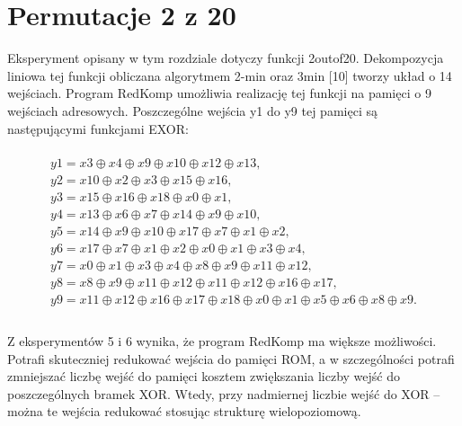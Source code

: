 \section{Permutacje 2 z 20}

Eksperyment opisany w tym rozdziale dotyczy funkcji 2outof20.
Dekompozycja liniowa tej funkcji obliczana algorytmem 2-min oraz 3min [10] tworzy układ o 14 wejściach.
Program RedKomp umożliwia realizację tej funkcji na pamięci o 9 wejściach adresowych.
Poszczególne wejścia y1 do y9 tej pamięci są następującymi funkcjami EXOR:

\begin{multline} \\
y1 = x3 \oplus x4 \oplus x9 \oplus x10 \oplus x12 \oplus x13, \\
y2 = x10 \oplus x2 \oplus x3 \oplus x15 \oplus x16, \\
y3 = x15 \oplus x16 \oplus x18 \oplus x0 \oplus x1, \\
y4 = x13 \oplus x6 \oplus x7 \oplus x14 \oplus x9 \oplus x10, \\
y5 = x14 \oplus x9 \oplus x10 \oplus x17 \oplus x7 \oplus x1 \oplus x2, \\
y6 = x17 \oplus x7 \oplus x1 \oplus x2 \oplus x0 \oplus x1 \oplus x3 \oplus x4, \\
y7 = x0 \oplus x1 \oplus x3 \oplus x4 \oplus x8 \oplus x9 \oplus x11 \oplus x12, \\
y8 = x8 \oplus x9 \oplus x11 \oplus x12 \oplus x11 \oplus x12 \oplus x16 \oplus x17, \\
y9 = x11 \oplus x12 \oplus x16 \oplus x17 \oplus x18 \oplus x0 \oplus x1 \oplus x5 \oplus x6 \oplus x8 \oplus x9. \\
\end{multline} \\

Z eksperymentów 5 i 6 wynika, że program RedKomp ma większe możliwości.
Potrafi skuteczniej redukować wejścia do pamięci ROM,
a w szczególności potrafi zmniejszać liczbę wejść do pamięci
kosztem zwiększania liczby wejść do poszczególnych bramek XOR.
Wtedy, przy nadmiernej liczbie wejść do XOR – można te wejścia redukować stosując strukturę wielopoziomową.